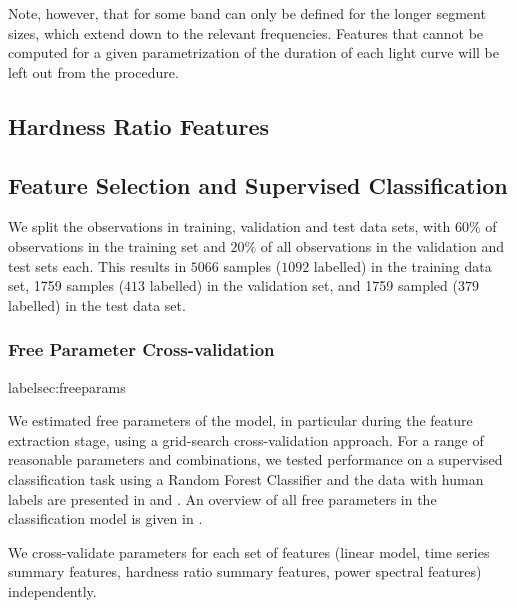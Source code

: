 \documentclass[12pt]{emulateapj}
\begin{document}
Note, however, that for some band can only be defined for the longer segment sizes, which extend down to the relevant frequencies. Features 
that cannot be computed for a given parametrization of the duration of each light curve will be left out from the procedure.

\subsection{Hardness Ratio Features}



\subsection{Feature Selection and Supervised Classification}
We split the observations in training, validation and test data sets, with $60\%$ of observations in the training set and $20\%$ of all observations in the validation and test sets each. This results in $5066$ samples ($1092$ labelled) in the training data set, 1759 samples ($413$ labelled) in the validation set, and 1759 sampled ($379$ labelled) in the test data set.  

\subsubsection{Free Parameter Cross-validation}
label{sec:freeparams}

We estimated free parameters of the model, in particular during the feature extraction stage, using a grid-search cross-validation approach. For a range of reasonable parameters and combinations, we tested performance on a supervised classification task using a Random Forest Classifier and the data with human labels are presented in \citep{belloni2000} and \citep{kleinwolt2002}. An overview of all free parameters in the classification model is given in .

We cross-validate parameters for each set of features (linear model, time series summary features, hardness ratio summary features, power spectral features) independently.
\end{document}

